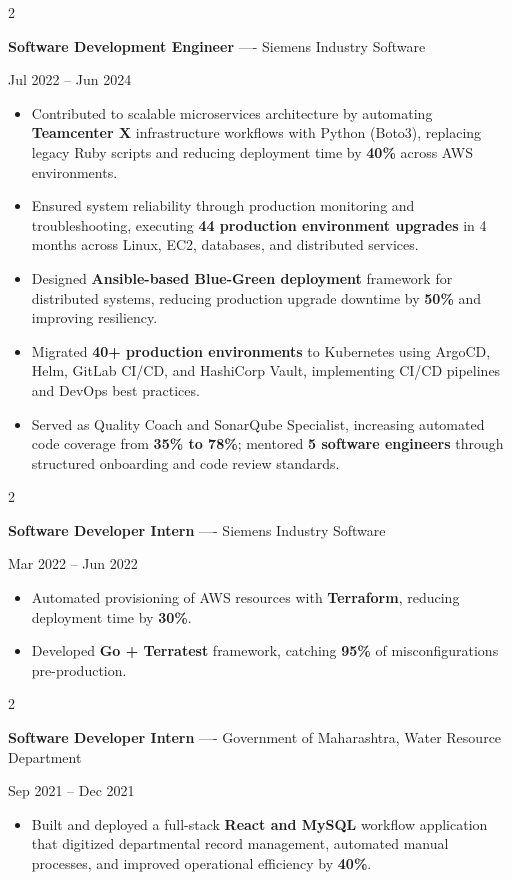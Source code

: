 \documentclass[10pt, letterpaper]{article}
\newenvironment{highlights}{
    \begin{itemize}[
        topsep=0.10 cm,
        parsep=0.06 cm,
        partopsep=0pt,
        itemsep=0.06 cm,
        leftmargin=12pt
    ]
}{
    \end{itemize}
}
\newenvironment{twocolentry}[2][]{
    \onecolentry
    \def\secondColumn{#2}
    \setcolumnwidth{\fill, 4.5 cm}
    \begin{paracol}{2}
}{
    \switchcolumn \raggedleft \secondColumn
    \end{paracol}
    \endonecolentry
}
\begin{document}
\vspace{0.15 cm}

\begin{twocolentry}{Jul 2022 -- Jun 2024}
\textbf{Software Development Engineer} ---- Siemens Industry Software
\end{twocolentry}
\begin{highlights}
  \item Contributed to scalable microservices architecture by automating \textbf{Teamcenter X} infrastructure workflows with Python (Boto3), replacing legacy Ruby scripts and reducing deployment time by \textbf{40\%} across AWS environments.
  \item Ensured system reliability through production monitoring and troubleshooting, executing \textbf{44 production environment upgrades} in 4 months across Linux, EC2, databases, and distributed services.
  \item Designed \textbf{Ansible-based Blue-Green deployment} framework for distributed systems, reducing production upgrade downtime by \textbf{50\%} and improving resiliency.
  \item Migrated \textbf{40+ production environments} to Kubernetes using ArgoCD, Helm, GitLab CI/CD, and HashiCorp Vault, implementing CI/CD pipelines and DevOps best practices.
  \item Served as Quality Coach and SonarQube Specialist, increasing automated code coverage from \textbf{35\% to 78\%}; mentored \textbf{5 software engineers} through structured onboarding and code review standards.
\end{highlights}

\vspace{0.15 cm}

\begin{twocolentry}{Mar 2022 -- Jun 2022}
\textbf{Software Developer Intern} ---- Siemens Industry Software
\end{twocolentry}
\begin{highlights}
  \item Automated provisioning of AWS resources with \textbf{Terraform}, reducing deployment time by \textbf{30\%}.
  \item Developed \textbf{Go + Terratest} framework, catching \textbf{95\%} of misconfigurations pre-production.
\end{highlights}

\vspace{0.15 cm}

\begin{twocolentry}{Sep 2021 -- Dec 2021}
\textbf{Software Developer Intern} ---- Government of Maharashtra, Water Resource Department
\end{twocolentry}
\begin{highlights}
  \item Built and deployed a full-stack \textbf{React and MySQL} workflow application that digitized departmental record management, automated manual processes, and improved operational efficiency by \textbf{40\%}.
\end{highlights}
\end{document}
